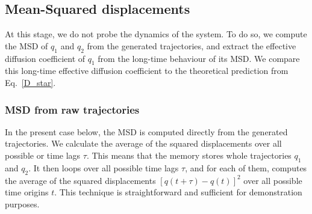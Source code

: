 \subsection{Mean-Squared displacements}
At this stage, we do not probe the dynamics of the system. To do so, we compute the MSD of $q_1$ and $q_2$ from the generated trajectories, and extract the effective diffusion coefficient of $q_1$ from the long-time behaviour of its MSD. We compare this long-time effective diffusion coefficient to the theoretical prediction from Eq.~\ref{D_star}.

\subsubsection{MSD from raw trajectories}
In the present case below, the MSD is computed directly from the generated trajectories. We calculate the average of the squared displacements over all possible or time lags $\tau$. This means that the memory stores whole trajectories $q_1$ and $q_2$. It then loops over all possible time lags $\tau$, and for each of them, computes the average of the squared displacements $[q(t + \tau) - q(t)]^2$ over all possible time origins $t$. This technique is straightforward and sufficient for demonstration purposes. 

